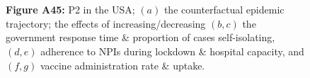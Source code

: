 \documentclass[paper=a4,fontsize=11pt]{article}
\begin{document}
\begin{figure}[!h]
  \\
  \hspace{1.76cm}
  \\
  \caption*{\textbf{Figure A45:} P2 in the USA; $(a)$ the counterfactual epidemic trajectory; the effects of increasing/decreasing $(b,c)$ the government response time \& proportion of cases self-isolating, $(d,e)$ adherence to NPIs during lockdown \& hospital capacity, and $(f,g)$ vaccine administration rate \& uptake.}
\end{figure}
\end{document}
